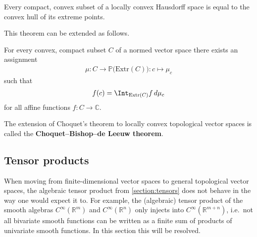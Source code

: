     \begin{theorem}\label{functional:krein_milman}
        Every compact, convex subset of a locally convex Hausdorff space is equal to the convex hull of its extreme points.
    \end{theorem}
    This theorem can be extended as follows.
    \begin{theorem}[Choquet]\label{functional:choquet}
        For every convex, compact subset $C$ of a normed vector space there exists an assignment
        \begin{gather}
            \mu:C\rightarrow\mathbb{P}\bigl(\mathrm{Extr}(C)\bigr):c\mapsto\mu_c
        \end{gather}
        such that
        \begin{gather}
            f(c) = \Int_{\mathrm{Extr}(C)}f\,d\mu_c
        \end{gather}
        for all affine functions $f:C\rightarrow\mathbb{C}$.
    \end{theorem}
    \begin{remark}
        The extension of Choquet's theorem to locally convex topological vector spaces is called the \textbf{Choquet--Bishop--de Leeuw theorem}.
    \end{remark}


\subsection{Tensor products}

    When moving from finite-dimensional vector spaces to general topological vector spaces, the algebraic tensor product from \cref{section:tensors} does not behave in the way one would expect it to. For example, the (algebraic) tensor product of the smooth algebras $C^\infty(\mathbb{R}^m)$ and $C^\infty(\mathbb{R}^n)$ only injects into $C^\infty(\mathbb{R}^{m+n})$, i.e.~not all bivariate smooth functions can be written as a finite sum of products of univariate smooth functions. In this section this will be resolved.

